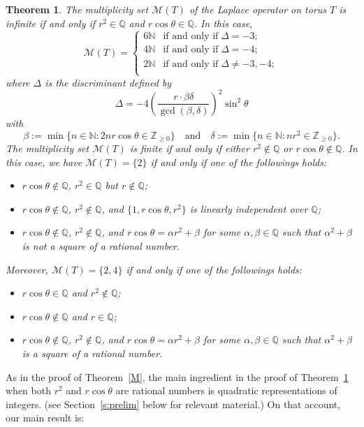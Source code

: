 \documentclass[11pt]{amsart}
\newtheorem{theorem}{Theorem}[section]
\theoremstyle{definition}
\begin{document}
\begin{theorem}\label{N} The multiplicity set $\mathcal{M}(T)$ of the Laplace operator on torus $T$ is infinite if and only if $r^2\in\mathbb{Q}$ and $r\cos{\theta}\in \mathbb{Q}$. In this case,  
\[
\mathcal{M}(T)=
\begin{cases}
    6\mathbb{N}&\text{if and only if}\; \Delta=-3;\\
    4\mathbb{N}&\text{if and only if}\; \Delta=-4;\\
    2\mathbb{N}&\text{if and only if}\; \Delta\neq-3,-4;\\
\end{cases}
\]
where $\Delta$ is the discriminant defined by
\[
\Delta = -4\left(\dfrac{r\cdot\beta\delta}{\gcd(\beta,\delta)}\right)^2\sin^2\theta
\]
with
\[
\beta:=\min\{n\in\mathbb{N}:2nr\cos\theta\in\mathbb{Z}_{\geq 0}\} \quad\text{and}\quad \delta:=\min\{n\in\mathbb{N}:nr^2\in\mathbb{Z}_{\geq 0}\}.
\]
The multiplicity set $\mathcal{M}(T)$ is finite if and only if  either $r^2\not\in\mathbb{Q}$ or $r\cos\theta\not\in\mathbb{Q}$. In this case,  we have 
$\mathcal{M}(T)=\{2\}$ if and only if one of the followings holds: 
\begin{itemize}
\item[$(1)$] $r\cos\theta\not\in\mathbb{Q}$, $r^2\in\mathbb{Q}$ but $r\not\in\mathbb{Q}$;
\item[$(2)$] $r\cos\theta\not\in\mathbb{Q}$, $r^2\not\in\mathbb{Q}$, and $\{1, r\cos\theta, r^2\}$ is linearly independent over $\mathbb{Q}$;
\item[$(3)$] $r\cos\theta\not\in\mathbb{Q}$, $r^2\not\in\mathbb{Q}$, and $r\cos\theta=\alpha r^2+\beta$ for some $\alpha, \beta\in\mathbb{Q}$ such that $\alpha^2+\beta$ is not a square of a rational number.
\end{itemize}
Moreover, $\mathcal{M}(T)=\{2, 4\}$ if and only if one of the followings holds:
\begin{itemize}
\item[$(1)$] $r\cos\theta\in\mathbb{Q}$ and $r^2\not\in\mathbb{Q}$;
\item[$(2)$] $r\cos\theta\not\in\mathbb{Q}$ and $r\in\mathbb{Q}$;
\item[$(3)$] $r\cos\theta\not\in\mathbb{Q}$, $r^2\not\in\mathbb{Q}$, and $r\cos\theta=\alpha r^2+\beta$ for some $\alpha, \beta\in\mathbb{Q}$ such that $\alpha^2+\beta$ is a square of a rational number.
\end{itemize}
\end{theorem}

As in the proof of Theorem~\ref{M}, the main ingredient in the proof of Theorem~\ref{N} when both $r^2$ and $r\cos\theta$ are rational numbers is  
quadratic representations of integers. (see Section~\ref{s:prelim} below for relevant material.) On that account, our main result is:
\end{document}
